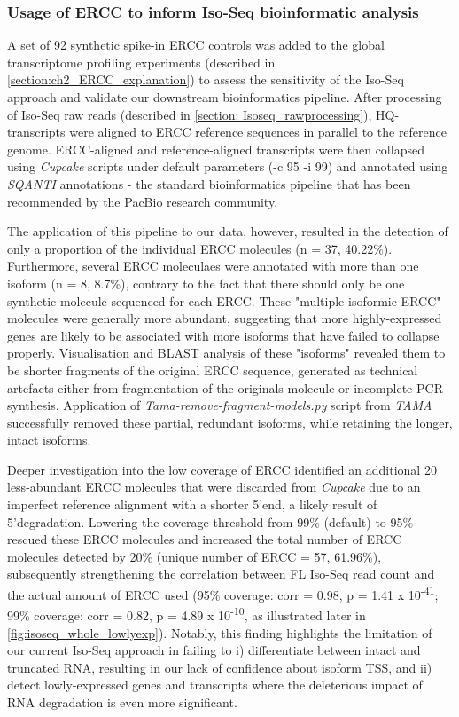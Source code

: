 \newpage
\subsubsection{Usage of ERCC to inform Iso-Seq bioinformatic analysis}
A set of 92 synthetic spike-in ERCC controls was added to the global transcriptome profiling experiments (described in \cref{section:ch2_ERCC_explanation}) to assess the sensitivity of the Iso-Seq approach and validate our downstream bioinformatics pipeline. After processing of Iso-Seq raw reads (described in \cref{section: Isoseq_rawprocessing}), HQ-transcripts were aligned to ERCC reference sequences in parallel to the reference genome. ERCC-aligned and reference-aligned transcripts were then collapsed using \textit{Cupcake} scripts under default parameters (-c 95 -i 99) and annotated using \textit{SQANTI} annotations - the standard bioinformatics pipeline that has been recommended by the PacBio research community. 

The application of this pipeline to our data, however, resulted in the detection of only a proportion of the individual ERCC molecules (n = 37, 40.22\%). Furthermore, several ERCC moleculaes were annotated with more than one isoform (n = 8, 8.7\%), contrary to the fact that there should only be one synthetic molecule sequenced for each ERCC. These "multiple-isoformic ERCC" molecules were generally more abundant, suggesting that more highly-expressed genes are likely to be associated with more isoforms that have failed to collapse properly. Visualisation and BLAST analysis of these "isoforms" revealed them to be shorter fragments of the original ERCC sequence, generated as technical artefacts either from fragmentation of the originals molecule or incomplete PCR synthesis. Application of \textit{Tama-remove-fragment-models.py} script from \textit{TAMA}\cite{Kuo2017} successfully removed these partial, redundant isoforms, while retaining the longer, intact isoforms. 

Deeper investigation into the low coverage of ERCC identified an additional 20 less-abundant ERCC molecules that were 
discarded from \textit{Cupcake} due to an imperfect reference alignment with a shorter 5'end, a likely result of 5'degradation. Lowering the coverage threshold from 99\% (default) to 95\% rescued these ERCC molecules and increased the total number of ERCC molecules detected by 20\% (unique number of ERCC = 57, 61.96\%), subsequently strengthening the correlation between FL Iso-Seq read count and the actual amount of ERCC used (95\% coverage: corr = 0.98, p = 1.41 x 10\textsuperscript{-41}; 99\% coverage: corr = 0.82, p = 4.89 x 10\textsuperscript{-10}, as illustrated later in \cref{fig:isoseq_whole_lowlyexp}). Notably, this finding highlights the limitation of our current Iso-Seq approach in failing to i) differentiate between intact and truncated RNA, resulting in our lack of confidence about isoform TSS, and ii) detect lowly-expressed genes and transcripts where the deleterious impact of RNA degradation is even more significant. 
